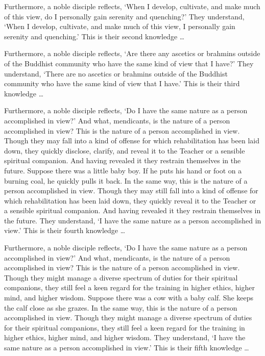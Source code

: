 \documentclass[12pt,openany]{book}%
\begin{document}
Furthermore, a noble disciple reflects, ‘When I develop, cultivate, and make much of this view, do I personally gain serenity and quenching?’ They understand, ‘When I develop, cultivate, and make much of this view, I personally gain serenity and quenching.’ This is their second knowledge … 

Furthermore, a noble disciple reflects, ‘Are there any ascetics or brahmins outside of the Buddhist community who have the same kind of view that I have?’ They understand, ‘There are no ascetics or brahmins outside of the Buddhist community who have the same kind of view that I have.’ This is their third knowledge … 

Furthermore, a noble disciple reflects, ‘Do I have the same nature as a person accomplished in view?’ And what, mendicants, is the nature of a person accomplished in view? This is the nature of a person accomplished in view. Though they may fall into a kind of offense for which rehabilitation has been laid down, they quickly disclose, clarify, and reveal it to the Teacher or a sensible spiritual companion. And having revealed it they restrain themselves in the future. Suppose there was a little baby boy. If he puts his hand or foot on a burning coal, he quickly pulls it back. In the same way, this is the nature of a person accomplished in view. Though they may still fall into a kind of offense for which rehabilitation has been laid down, they quickly reveal it to the Teacher or a sensible spiritual companion. And having revealed it they restrain themselves in the future. They understand, ‘I have the same nature as a person accomplished in view.’ This is their fourth knowledge … 

Furthermore, a noble disciple reflects, ‘Do I have the same nature as a person accomplished in view?’ And what, mendicants, is the nature of a person accomplished in view? This is the nature of a person accomplished in view. Though they might manage a diverse spectrum of duties for their spiritual companions, they still feel a keen regard for the training in higher ethics, higher mind, and higher wisdom. Suppose there was a cow with a baby calf. She keeps the calf close as she grazes. In the same way, this is the nature of a person accomplished in view. Though they might manage a diverse spectrum of duties for their spiritual companions, they still feel a keen regard for the training in higher ethics, higher mind, and higher wisdom. They understand, ‘I have the same nature as a person accomplished in view.’ This is their fifth knowledge … 
\end{document}
